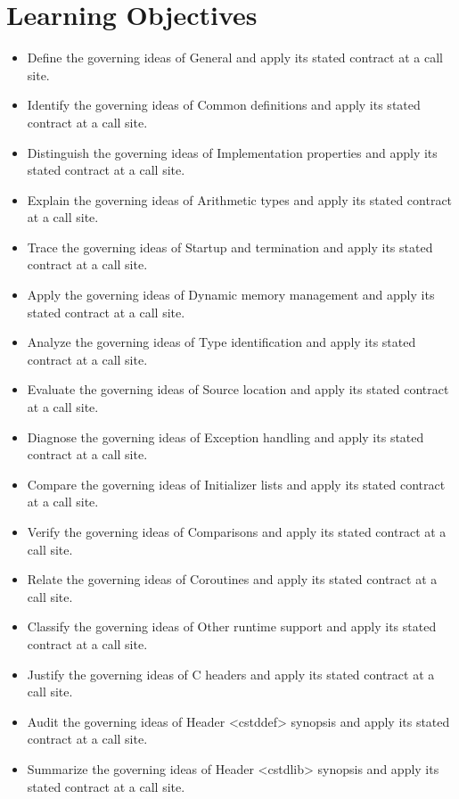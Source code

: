 \documentclass[11pt,letterpaper]{article}
\begin{document}
\section{Learning Objectives}
\begin{itemize}[label=\textcolor{CornellReferenceTeal}{$\blacktriangleright$}]
\item Define the governing ideas of General and apply its stated contract at a call site.
\item Identify the governing ideas of Common definitions and apply its stated contract at a call site.
\item Distinguish the governing ideas of Implementation properties and apply its stated contract at a call site.
\item Explain the governing ideas of Arithmetic types and apply its stated contract at a call site.
\item Trace the governing ideas of Startup and termination and apply its stated contract at a call site.
\item Apply the governing ideas of Dynamic memory management and apply its stated contract at a call site.
\item Analyze the governing ideas of Type identification and apply its stated contract at a call site.
\item Evaluate the governing ideas of Source location and apply its stated contract at a call site.
\item Diagnose the governing ideas of Exception handling and apply its stated contract at a call site.
\item Compare the governing ideas of Initializer lists and apply its stated contract at a call site.
\item Verify the governing ideas of Comparisons and apply its stated contract at a call site.
\item Relate the governing ideas of Coroutines and apply its stated contract at a call site.
\item Classify the governing ideas of Other runtime support and apply its stated contract at a call site.
\item Justify the governing ideas of C headers and apply its stated contract at a call site.
\item Audit the governing ideas of Header <cstddef> synopsis and apply its stated contract at a call site.
\item Summarize the governing ideas of Header <cstdlib> synopsis and apply its stated contract at a call site.
\end{itemize}
\end{document}
